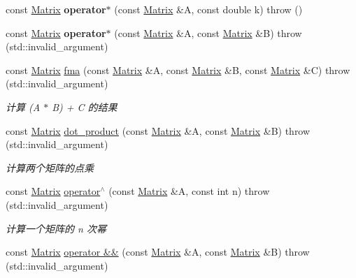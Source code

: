 \begin{DoxyCompactItemize}
const \hyperlink{classkerbal_1_1math_1_1_matrix}{Matrix} {\bfseries operator$\ast$} (const \hyperlink{classkerbal_1_1math_1_1_matrix}{Matrix} \&A, const double k)  throw ()
\item 
\mbox{\label{classkerbal_1_1math_1_1_matrix_a26be23966c1457aaa6ca7904f3388504}} 
const \hyperlink{classkerbal_1_1math_1_1_matrix}{Matrix} {\bfseries operator$\ast$} (const \hyperlink{classkerbal_1_1math_1_1_matrix}{Matrix} \&A, const \hyperlink{classkerbal_1_1math_1_1_matrix}{Matrix} \&B)  throw (std\+::invalid\+\_\+argument)
\item 
const \hyperlink{classkerbal_1_1math_1_1_matrix}{Matrix} \hyperlink{classkerbal_1_1math_1_1_matrix_aef00278756b7155aa065aa0e2c206b91}{fma} (const \hyperlink{classkerbal_1_1math_1_1_matrix}{Matrix} \&A, const \hyperlink{classkerbal_1_1math_1_1_matrix}{Matrix} \&B, const \hyperlink{classkerbal_1_1math_1_1_matrix}{Matrix} \&C)  throw (std\+::invalid\+\_\+argument)
\begin{DoxyCompactList}\small\item\em 计算 (A $\ast$ B) + C 的结果 \end{DoxyCompactList}\item 
const \hyperlink{classkerbal_1_1math_1_1_matrix}{Matrix} \hyperlink{classkerbal_1_1math_1_1_matrix_a34aab263e821d766d31517e9d03a1aca}{dot\+\_\+product} (const \hyperlink{classkerbal_1_1math_1_1_matrix}{Matrix} \&A, const \hyperlink{classkerbal_1_1math_1_1_matrix}{Matrix} \&B)  throw (std\+::invalid\+\_\+argument)
\begin{DoxyCompactList}\small\item\em 计算两个矩阵的点乘 \end{DoxyCompactList}\item 
const \hyperlink{classkerbal_1_1math_1_1_matrix}{Matrix} \hyperlink{classkerbal_1_1math_1_1_matrix_af46d90e12227e9e1e8c8242cb2b0a93a}{operator$^\wedge$} (const \hyperlink{classkerbal_1_1math_1_1_matrix}{Matrix} \&A, const int n)  throw (std\+::invalid\+\_\+argument)
\begin{DoxyCompactList}\small\item\em 计算一个矩阵的 n 次幂 \end{DoxyCompactList}\item 
const \hyperlink{classkerbal_1_1math_1_1_matrix}{Matrix} \hyperlink{classkerbal_1_1math_1_1_matrix_a8b58a45223c7264d0e45d238f66b1eb5}{operator \&\&} (const \hyperlink{classkerbal_1_1math_1_1_matrix}{Matrix} \&A, const \hyperlink{classkerbal_1_1math_1_1_matrix}{Matrix} \&B)  throw (std\+::invalid\+\_\+argument)

\end{DoxyCompactItemize}
